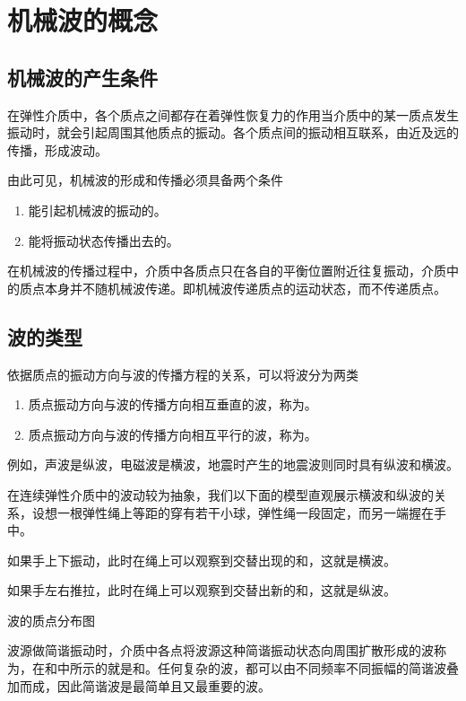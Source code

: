 \section{机械波的概念}

\subsection{机械波的产生条件}
在弹性介质中，各个质点之间都存在着弹性恢复力的作用当介质中的某一质点发生振动时，就会引起周围其他质点的振动。各个质点间的振动相互联系，由近及远的传播，形成波动。

由此可见，机械波的形成和传播必须具备两个条件
\begin{enumerate}
    \item 能引起机械波的振动的。
    \item 能将振动状态传播出去的。
\end{enumerate}
在机械波的传播过程中，介质中各质点只在各自的平衡位置附近往复振动，介质中的质点本身并不随机械波传递。即机械波传递质点的运动状态，而不传递质点。\vspace{-10pt}

\subsection{波的类型}
依据质点的振动方向与波的传播方程的关系，可以将波分为两类
\begin{enumerate}
    \item 质点振动方向与波的传播方向相互垂直的波，称为。
    \item 质点振动方向与波的传播方向相互平行的波，称为。
\end{enumerate}
例如，声波是纵波，电磁波是横波，地震时产生的地震波则同时具有纵波和横波。

在连续弹性介质中的波动较为抽象，我们以下面的模型直观展示横波和纵波的关系，设想一根弹性绳上等距的穿有若干小球，弹性绳一段固定，而另一端握在手中。

如果手上下振动，此时在绳上可以观察到交替出现的和，这就是横波。

如果手左右推拉，此时在绳上可以观察到交替出新的和，这就是纵波。

\begin{Figure}{波的质点分布图}
\end{Figure}
波源做简谐振动时，介质中各点将波源这种简谐振动状态向周围扩散形成的波称为，在和中所示的就是和。任何复杂的波，都可以由不同频率不同振幅的简谐波叠加而成，因此简谐波是最简单且又最重要的波。

